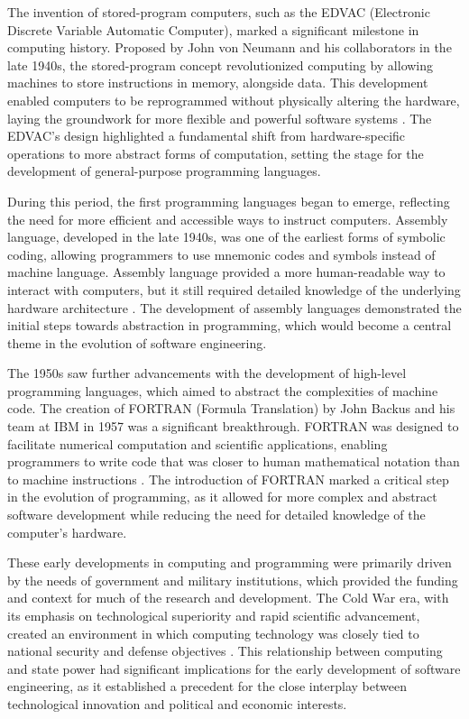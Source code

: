 \begin{refsection}
The invention of stored-program computers, such as the EDVAC (Electronic Discrete Variable Automatic Computer), marked a significant milestone in computing history. Proposed by John von Neumann and his collaborators in the late 1940s, the stored-program concept revolutionized computing by allowing machines to store instructions in memory, alongside data. This development enabled computers to be reprogrammed without physically altering the hardware, laying the groundwork for more flexible and powerful software systems \cite[pp.~55-57]{metropolis1980beginnings}. The EDVAC's design highlighted a fundamental shift from hardware-specific operations to more abstract forms of computation, setting the stage for the development of general-purpose programming languages.

During this period, the first programming languages began to emerge, reflecting the need for more efficient and accessible ways to instruct computers. Assembly language, developed in the late 1940s, was one of the earliest forms of symbolic coding, allowing programmers to use mnemonic codes and symbols instead of machine language. Assembly language provided a more human-readable way to interact with computers, but it still required detailed knowledge of the underlying hardware architecture \cite[pp.~68-70]{davis2001engineers}. The development of assembly languages demonstrated the initial steps towards abstraction in programming, which would become a central theme in the evolution of software engineering.

The 1950s saw further advancements with the development of high-level programming languages, which aimed to abstract the complexities of machine code. The creation of FORTRAN (Formula Translation) by John Backus and his team at IBM in 1957 was a significant breakthrough. FORTRAN was designed to facilitate numerical computation and scientific applications, enabling programmers to write code that was closer to human mathematical notation than to machine instructions \cite[pp.~99-102]{backus1957fortran}. The introduction of FORTRAN marked a critical step in the evolution of programming, as it allowed for more complex and abstract software development while reducing the need for detailed knowledge of the computer’s hardware.

These early developments in computing and programming were primarily driven by the needs of government and military institutions, which provided the funding and context for much of the research and development. The Cold War era, with its emphasis on technological superiority and rapid scientific advancement, created an environment in which computing technology was closely tied to national security and defense objectives \cite[pp.~21-23]{edwards1996closed}. This relationship between computing and state power had significant implications for the early development of software engineering, as it established a precedent for the close interplay between technological innovation and political and economic interests.


\end{refsection}
